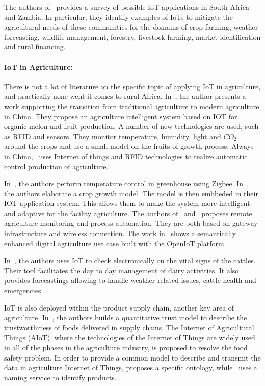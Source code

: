The authors of~\cite{Dlodlo2015} provides a survey of possible IoT applications in South Africa and Zambia.
In particular, they identify examples of IoTs to mitigate the agricultural needs of these communities for the domains of crop farming, weather forecasting, wildlife management, forestry, livestock farming, market identification and rural financing.


\paragraph{IoT in Agriculture:}
There is not a lot of literature on the specific topic of applying IoT in agriculture, and practically none went it comes to rural Africa.
In~\cite{Bing2012}, the author presents a work supporting the transition from traditional agriculture to modern agriculture in China.
They propose an agriculture intelligent system based on IOT for organic melon and fruit production. 
A number of new technologies are used, such as RFID and sensors.
They monitor temperature, humidity, light and $CO_2$ around the crops and use a small model on the fruits of growth process.
Always in China,~\cite{TongKe2013} uses Internet of things and RFID technologies to realize automatic control production of agriculture.

In~\cite{Dan2015}, the authors perform temperature control in greenhouse using Zigbee.
In~\cite{Hu2011a}, the authors elaborate a crop growth model.
The model is then embbeded in their IOT application system.
This allows them to make the system more intelligent and adaptive for the facility agriculture.
The authors of~\cite{Nakutis2015} and~\cite{Sarkar2016} proposes remote agriculture monitoring and process automation.
They are both based on gateway infrastructure and wireless connection.
The work in~\cite{Jayaraman2015} shows a semantically enhanced digital agriculture use case built with the OpenIoT platform.

In~\cite{Ilapakurti2015}, the authors uses IoT to check electronically on the vital signs of the cattles.
Their tool facilitates the day to day management of dairy activities.
It also provides forecastings allowing to handle weather related issues, cattle health and emergencies.

IoT is also deployed within the product supply chain, another key area of agriculture.
In~\cite{Han2014}, the authors builds a quantitative trust model to describe the trustworthiness of foods delivered in supply chains.
The Internet of Agricultural Things (AIoT), where the technologies of the Internet of Things are widely used in all of the phases in the agriculture industry, is proposed to resolve the food safety problem.
In order to provide a common model to describe and transmit the data in agriculture Internet of Things, \cite{Hu2011} proposes a specific ontology, while~\cite{Liu2014} uses a naming service to identify products.


